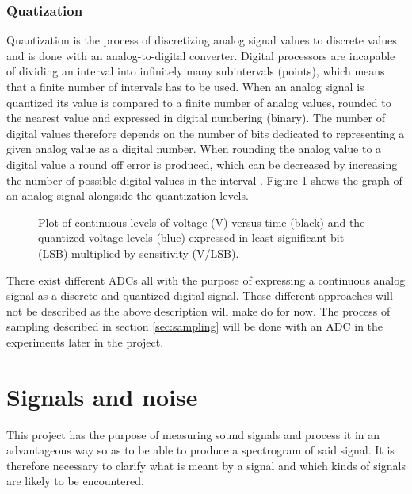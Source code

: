 \subsubsection{Quatization}
Quantization is the process of discretizing analog signal values to discrete values and is done with an analog-to-digital converter. Digital processors are incapable of dividing an interval into infinitely many subintervals (points), which means that a finite number of intervals has to be used. When an analog signal is quantized its value is compared to a finite number of analog values, rounded to the nearest value and expressed in digital numbering (binary). The number of digital values therefore depends on the number of bits dedicated to representing a given analog value as a digital number. When rounding the analog value to a digital value a round off error is produced, which can be decreased by increasing the number of possible digital values in the interval \cite{pelgrom}. Figure \ref{fig:quant} shows the graph of an analog signal alongside the quantization levels.
\begin{figure}[H]
\centering
{}
\caption{Plot of continuous levels of voltage (V) versus time (black) and the quantized voltage levels (blue) expressed in least significant bit (LSB) multiplied by sensitivity (V/LSB).}
\label{fig:quant}
\end{figure}

There exist different ADCs \cite{pelgrom} all with the purpose of expressing a continuous analog signal as a discrete and quantized digital signal. These different approaches will  not be described as the above description will make do for now. The process of sampling described in section \ref{sec:sampling} will be done with an ADC in the experiments later in the project.

\section{Signals and noise}
This project has the purpose of measuring sound signals and process it in an advantageous way so as to be able to produce a spectrogram of said signal. It is therefore necessary to clarify what is meant by a signal and which kinds of signals are likely to be encountered.

